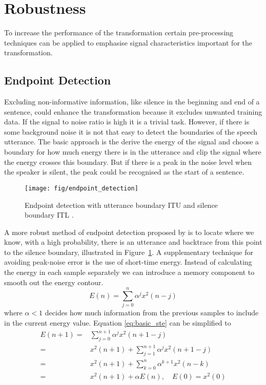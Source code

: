 
\section{Robustness} %
\label{sec:robustness}
To increase the performance of the transformation certain pre-processing techniques can be applied to emphasise signal characteristics important for the transformation.

\subsection{Endpoint Detection} %
\label{sub:endpoint_detection}
Excluding non-informative information, like silence in the beginning and end of a sentence, could enhance the transformation because it excludes unwanted training data. If the signal to noise ratio is high it is a trivial task. However, if there is some background noise it is not that easy to detect the boundaries of the speech utterance. The basic approach is the derive the energy of the signal and choose a boundary for how much energy there is in the utterance and clip the signal where the energy crosses this boundary. But if there is a peak in the noise level when the speaker is silent, the peak could be recognised as the start of a sentence.

\begin{figure}[htbp]
	\begin{center}
		\texttt{[image: fig/endpoint\_detection]}
		\caption{Endpoint detection with utterance boundary ITU and silence boundary ITL \cite{rabiner75}.}
		\label{fig:endpoint_detection}
	\end{center}
\end{figure}

A more robust method of endpoint detection proposed by \cite{rabiner75} is to locate where we know, with a high probability, there is an utterance and backtrace from this point to the silence boundary, illustrated in Figure~\ref{fig:endpoint_detection}. A supplementary technique for avoiding peak-noise error is the use of short-time energy. Instead of calculating the energy in each sample separately we can introduce a memory component to smooth out the energy contour.
\begin{equation}
	E(n)=\sum_{j=0}^{n}\alpha^j x^2(n-j)
	\label{eq:basic_ste}
\end{equation}
where $\alpha < 1$ decides how much information from the previous samples to include in the current energy value. Equation \eqref{eq:basic_ste} can be simplified to
\begin{equation}
	\begin{split}
		E(n+1)=& \sum_{j=0}^{n+1}\alpha^jx^2(n+1-j)\\
		=& x^2(n+1)+\sum_{j=1}^{n+1}\alpha^jx^2(n+1-j)\\
		=& x^2(n+1)+\sum_{k=0}^{n}\alpha^{k+1} x^2(n-k)\\
		=& x^2(n+1)+\alpha E(n), \quad E(0)=x^2(0)\\
	\end{split}
	\label{eq:short_time_energy}
\end{equation}


